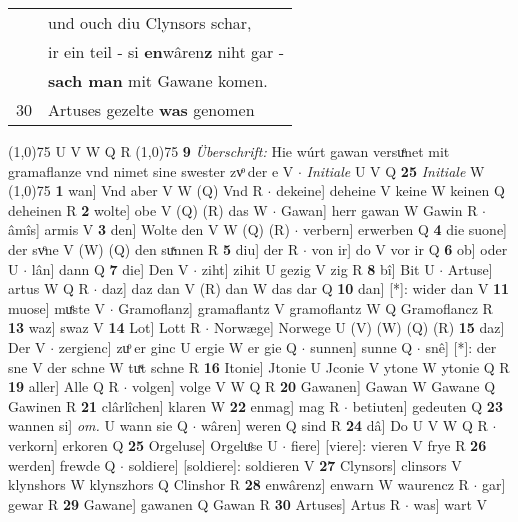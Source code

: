 \documentclass[8pt,a4paper,notitlepage]{article}
\begin{document}
\begin{table}[ht]
\begin{minipage}[t]{0.5\linewidth}
\begin{tabular}{rl}
 & und ouch diu Clynsors schar,\\ 
 & ir ein teil - si \textbf{en}wâren\textbf{z} niht gar -\\ 
 & \textbf{sach man} mit Gawane komen.\\ 
30 & Artuses gezelte \textbf{was} genomen\\ 
\end{tabular}
\scriptsize
\line(1,0){75} \newline
U V W Q R \newline
\line(1,0){75} \newline
\textbf{9} \textit{Überschrift:} Hie wúrt gawan versuͤnet mit gramaflanze vnd nimet sine swester zvͦ der e V   $\cdot$ \textit{Initiale} U V Q  \textbf{25} \textit{Initiale} W  \newline
\line(1,0){75} \newline
\textbf{1} wan] Vnd aber V W (Q) Vnd R  $\cdot$ dekeine] deheine V keine W keinen Q deheinen R \textbf{2} wolte] obe V (Q) (R) das W  $\cdot$ Gawan] herr gawan W Gawin R  $\cdot$ âmîs] armis V \textbf{3} den] Wolte den V W (Q) (R)  $\cdot$ verbern] erwerben Q \textbf{4} die suone] der svͦne V (W) (Q) den suͯnnen R \textbf{5} diu] der R  $\cdot$ von ir] do V vor ir Q \textbf{6} ob] oder U  $\cdot$ lân] dann Q \textbf{7} die] Den V  $\cdot$ ziht] zihit U gezig V zig R \textbf{8} bî] Bit U  $\cdot$ Artuse] artus W Q R  $\cdot$ daz] daz dan V (R) dan W das dar Q \textbf{10} dan] [*]: wider dan V \textbf{11} muose] muͤste V  $\cdot$ Gramoflanz] gramaflantz V gramoflantz W Q Gramoflancz R \textbf{13} waz] swaz V \textbf{14} Lot] Lott R  $\cdot$ Norwæge] Norwege U (V) (W) (Q) (R) \textbf{15} daz] Der V  $\cdot$ zergienc] zuͦ er ginc U ergie W er gie Q  $\cdot$ sunnen] sunne Q  $\cdot$ snê] [*]: der sne V der schne W tuͯt schne R \textbf{16} Itonie] Jtonie U Jconie V ytone W ytonie Q R \textbf{19} aller] Alle Q R  $\cdot$ volgen] volge V W Q R \textbf{20} Gawanen] Gawan W Gawane Q Gawinen R \textbf{21} clârlîchen] klaren W \textbf{22} enmag] mag R  $\cdot$ betiuten] gedeuten Q \textbf{23} wannen si] \textit{om.} U wann sie Q  $\cdot$ wâren] weren Q sind R \textbf{24} dâ] Do U V W Q R  $\cdot$ verkorn] erkoren Q \textbf{25} Orgeluse] Orgeluͦse U  $\cdot$ fiere] [viere]: vieren V frye R \textbf{26} werden] frewde Q  $\cdot$ soldiere] [soldiere]: soldieren V \textbf{27} Clynsors] clinsors V klynshors W klynszhors Q Clinshor R \textbf{28} enwârenz] enwarn W waurencz R  $\cdot$ gar] gewar R \textbf{29} Gawane] gawanen Q Gawan R \textbf{30} Artuses] Artus R  $\cdot$ was] wart V \newline
\end{minipage}
\end{table}
\end{document}
